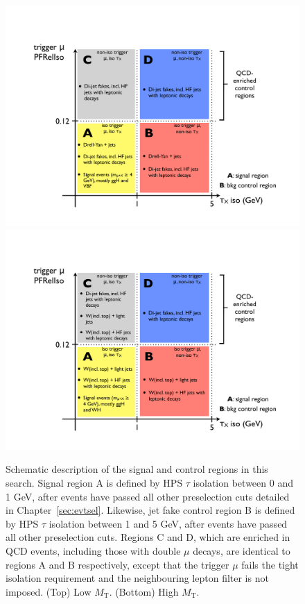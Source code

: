 \begin{figure}[hbtp]
  \begin{center}
    \includegraphics[width=2\cmsFigWidth]{figures/ABCD_annotated_lowMT}
    \includegraphics[width=2\cmsFigWidth]{figures/ABCD_annotated_highMT}
    \caption{Schematic description of the signal and control regions in this search. Signal region A is defined by HPS $\tau$ isolation between 0 and 1 GeV, after events have passed all other preselection cuts detailed in Chapter~\ref{sec:evtsel}. Likewise, jet fake control region B is defined by HPS $\tau$ isolation between 1 and 5 GeV, after events have passed all other preselection cuts. Regions C and D, which are enriched in QCD events, including those with double $\mu$ decays, are identical to regions A and B respectively, except that the trigger $\mu$ fails the tight isolation requirement and the neighbouring lepton filter is not imposed.  (Top) Low $M_{\text{T}}$.  (Bottom) High $M_{\text{T}}$.}
    \label{fig:regionsAB}
  \end{center}
\end{figure}

